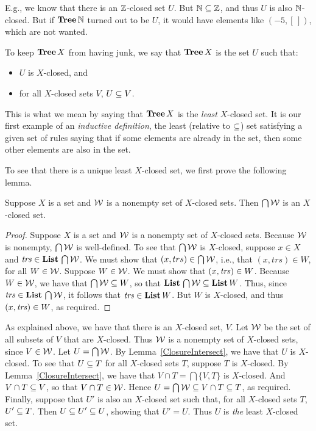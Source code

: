 E.g., we know that there is an $\mathbb{Z}$-closed set $U$.  But
$\mathbb{N}\subseteq\mathbb{Z}$, and thus $U$ is also $\mathbb{N}$-closed.  But if
$\mathbf{Tree}\,\mathbb{N}$ turned out to be $U$, it would have elements like
$(-5,[\,])$, which are not wanted.

To keep $\mathbf{Tree}\,X$ from having junk, we say that $\mathbf{Tree}\,X$ is
the set $U$ such that:
\begin{itemize}
\item $U$ is $X$-closed, and

\item for all $X$-closed sets $V$, $U\subseteq V$.
\end{itemize}
This is what we mean by saying that $\mathbf{Tree}\,X$ is the \emph{least}
$X$-closed set. It is our first example of an \emph{inductive
  definition}, the least (relative to $\subseteq$) set satisfying a given
set of rules saying that if some elements are already in the set, then
some other elements are also in the set.

To see that there is a unique least $X$-closed set, we first
prove the following lemma.

\begin{lemma}
\label{ClosureIntersect}
Suppose $X$ is a set and $\cal W$ is a nonempty set of $X$-closed sets.
Then $\bigcap{\cal W}$ is an $X$-closed set.
\end{lemma}

\begin{proof}
Suppose $X$ is a set and $\cal W$ is a nonempty set of $X$-closed
sets.  Because $\cal W$ is nonempty, $\bigcap\cal W$ is well-defined.
To see that $\bigcap{\cal W}$ is $X$-closed, suppose $x\in X$ and
${\it trs}\in\mathbf{List}\,\bigcap{\cal W}$.  We must show that $(x,trs)\in
\bigcap{\cal W}$, i.e., that $(x,trs)\in W$, for all $W\in\cal W$.
Suppose $W\in\cal W$.  We must show that $(x,{\it trs})\in W$.  Because
$W\in\cal W$, we have that $\bigcap{\cal W}\subseteq W$, so that
$\mathbf{List}\,\bigcap{\cal W}\subseteq\mathbf{List}\,W$.  Thus, since
${\it trs}\in\mathbf{List}\,\bigcap{\cal W}$, it follows that ${\it trs}\in\mathbf{List}\,W$.
But $W$ is $X$-closed, and thus $(x,{\it trs})\in W$, as required.
\end{proof}

As explained above, we have that there is an $X$-closed set, $V$.  Let
$\cal W$ be the set of all subsets of $V$ that are $X$-closed.  Thus
$\cal W$ is a nonempty set of $X$-closed sets, since $V\in\cal W$.
Let $U=\bigcap{\cal W}$.  By Lemma~\ref{ClosureIntersect}, we have
that $U$ is $X$-closed.  To see that $U\subseteq T$ for all $X$-closed sets
$T$, suppose $T$ is $X$-closed.  By Lemma~\ref{ClosureIntersect}, we
have that $V\cap T=\bigcap\{V,T\}$ is $X$-closed.  And $V\cap T\subseteq
V$, so that $V\cap T\in\cal W$.  Hence $U=\bigcap{\cal W}\subseteq V\cap
T\subseteq T$, as required.  Finally, suppose that $U'$ is also an
$X$-closed set such that, for all $X$-closed sets $T$, $U'\subseteq T$.
Then $U\subseteq U'\subseteq U$, showing that $U'=U$.  Thus $U$ is \emph{the} least
$X$-closed set.

